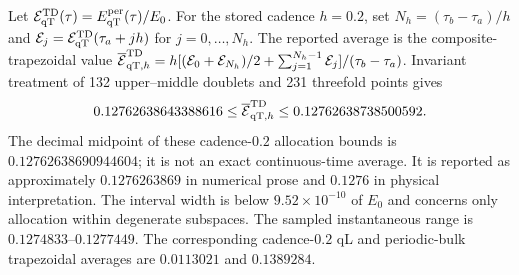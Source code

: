 \documentclass[10pt,aps,onecolumn,notitlepage,nofootinbib]{revtex4-2}
\newcommand{\qT}{\mathrm{qT}}
\begin{document}
Let $\mathcal E_{\qT}^{\rm TD}(\tau)=E_{\qT}^{\rm per}(\tau)/E_0$. For the stored cadence $h=0.2$, set $N_h=(\tau_b-\tau_a)/h$ and $\mathcal E_j=\mathcal E_{\qT}^{\rm TD}(\tau_a+jh)$ for $j=0,\ldots,N_h$. The reported average is the composite-trapezoidal value $\overline{\mathcal E}_{\qT,h}^{\rm TD}=h[(\mathcal E_0+\mathcal E_{N_h})/2+\sum_{j=1}^{N_h-1}\mathcal E_j]/(\tau_b-\tau_a)$. Invariant treatment of 132 upper--middle doublets and 231 threefold points gives
\begin{equation}
 0.12762638643388616\le\overline{\mathcal E}_{\qT,h}^{\rm TD}
 \le0.12762638738500592.
 \label{eq:s7-direct-result}
\end{equation}
The decimal midpoint of these cadence-$0.2$ allocation bounds is $0.12762638690944604$; it is not an exact continuous-time average. It is reported as approximately $0.1276263869$ in numerical prose and $0.1276$ in physical interpretation. The interval width is below $9.52\times10^{-10}$ of $E_0$ and concerns only allocation within degenerate subspaces. The sampled instantaneous range is $0.1274833$--$0.1277449$. The corresponding cadence-$0.2$ qL and periodic-bulk trapezoidal averages are $0.0113021$ and $0.1389284$.
\end{document}
